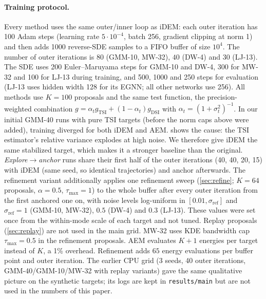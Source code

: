 \paragraph{Training protocol.}
Every method uses the same outer/inner loop as iDEM: each outer iteration has 100 Adam steps (learning rate $5\cdot10^{-4}$, batch 256, gradient clipping at norm 1) and then adds 1000 reverse-SDE samples to a FIFO buffer of size $10^4$. The number of outer iterations is $80$ (GMM-10, MW-32), $40$ (DW-4) and $30$ (LJ-13). The SDE uses 200 Euler--Maruyama steps for GMM-10 and DW-4, 300 for MW-32 and 100 for LJ-13 during training, and 500, 1000 and 250 steps for evaluation (LJ-13 uses hidden width 128 for its EGNN; all other networks use 256).
All methods use $K=100$ proposals and the same test function, the precision-weighted combination $g=\alpha_t g_{\mathrm{TSI}}+(1-\alpha_t)g_{\mathrm{DSI}}$ with $\alpha_t=(1+\sigma_t^2)^{-1}$. In our initial GMM-40 runs with pure TSI targets (before the norm caps above were added), training diverged for both iDEM and AEM.  shows the cause: the TSI estimator's relative variance explodes at high noise. We therefore give iDEM the same stabilized target, which makes it a stronger baseline than the original.
\emph{Explore$\to$anchor} runs share their first half of the outer iterations (40, 40, 20, 15) with iDEM (same seed, so identical trajectories) and anchor afterwards. The refinement variant additionally applies one refinement sweep (\cref{sec:refine}; $K=64$ proposals, $\alpha=0.5$, $\tau_{\max}=1$) to the whole buffer after every outer iteration from the first anchored one on, with noise levels log-uniform in $[0.01,\sigma_{\mathrm{ref}}]$ and $\sigma_{\mathrm{ref}}=1$ (GMM-10, MW-32), $0.5$ (DW-4) and $0.3$ (LJ-13). These values were set once from the within-mode scale of each target and not tuned. Replay proposals (\cref{sec:replay}) are not used in the main grid. MW-32 uses KDE bandwidth cap $\tau_{\max}=0.5$ in the refinement proposals.
AEM evaluates $K+1$ energies per target instead of $K$, a 1\% overhead. Refinement adds $65$ energy evaluations per buffer point and outer iteration.
The earlier CPU grid (3 seeds, 40 outer iterations, GMM-40/GMM-10/MW-32 with replay variants) gave the same qualitative picture on the synthetic targets; its logs are kept in \texttt{results/main} but are not used in the numbers of this paper.

